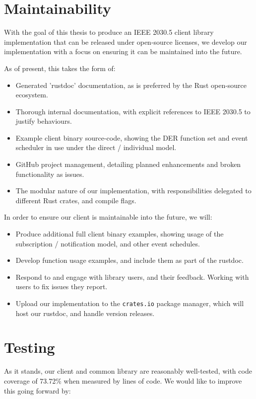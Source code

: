 \section{Maintainability}
With the goal of this thesis to produce an IEEE 2030.5 client library implementation that can be released under open-source licenses, we develop our implementation with a focus on ensuring it can be maintained into the future. 

As of present, this takes the form of:

\begin{itemize}
    \item Generated 'rustdoc' documentation, as is preferred by the Rust open-source ecosystem.
    \item Thorough internal documentation, with explicit references to IEEE 2030.5 to justify behaviours.
    \item Example client binary source-code, showing the DER function set and event scheduler in use under the direct / individual model.
    \item GitHub project management, detailing planned enhancements and broken functionality as issues.
    \item The modular nature of our implementation, with responsibilities delegated to different Rust crates, and compile flags.
\end{itemize}

In order to ensure our client is maintainable into the future, we will:

\begin{itemize}
    \item Produce additional full client binary examples, showing usage of the subscription / notification model, and other event schedules.
    \item Develop function usage examples, and include them as part of the rustdoc.
    \item Respond to and engage with library users, and their feedback. Working with users to fix issues they report.
    \item Upload our implementation to the \texttt{crates.io} package manager, which will host our rustdoc, and handle version releases.
\end{itemize}

\section{Testing}
As it stands, our client and common library are reasonably well-tested, with code coverage of 73.72\% when measured by lines of code. We would like to improve this going forward by:

